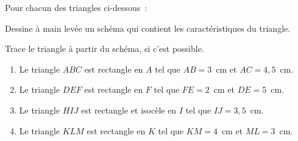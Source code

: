 \par Pour chacun des triangles ci-dessous :
\begin{myenumerate}
\item Dessine à main levée un schéma qui contient les caractéristiques du triangle.
\item Trace le triangle à partir du schéma, si c'est possible.
\end{myenumerate}
\begin{enumerate}[a/]
\item Le triangle $ABC$ est rectangle en $A$ tel que $AB=3$~cm et $AC=4,5$~cm.
\item Le triangle $DEF$ est rectangle en $F$ tel que $FE=2$~cm et $DE=5$~cm.
\item Le triangle $HIJ$ est rectangle et isocèle en $I$ tel que $IJ=3,5$~cm.
\item Le triangle $KLM$ est rectangle en $K$ tel que $KM=4$~cm et $ML=3$~cm.
\end{enumerate}

